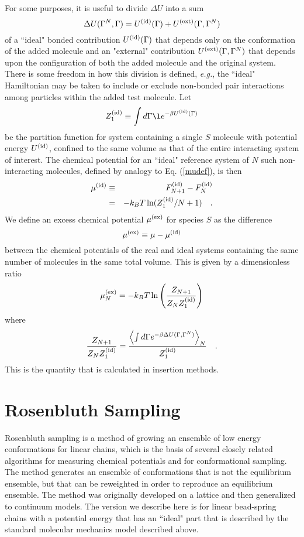 \documentclass[12pt]{article}
\newcommand{\eg}{{\it e.g.}}
\newcommand\system{\Gamma^{N}}
\newcommand\chain{\Gamma}
\newcommand\delU{\Delta U}
\newcommand\Uid{U^{({\rm id})}}
\newcommand\Uext{U^{({\rm ext})}}
\newcommand\Ztot{Z_{N+1}}
\newcommand\Zsystem{Z_{N}}
\newcommand\Zid{Z^{({\rm id})}}
\newcommand\Fid{F^{({\rm id})}}
\newcommand\muid{\mu^{({\rm id})}}
\newcommand\muex{\mu^{({\rm ex})}}
\begin{document}
For some purposes, it is useful to divide $\delU$ into a sum
\begin{equation}
   \delU(\system, \chain) = \Uid(\chain) + \Uext (\chain, \system)
\end{equation}
of a ``ideal" bonded contribution $\Uid(\chain)$ that depends only on the conformation of the added molecule and an "external" contribution $\Uext(\chain,\system)$ that depends upon the configuration of both the added molecule and the original system.  There is some freedom in how this division is defined, \eg, the ``ideal" Hamiltonian may be taken to include or exclude non-bonded pair interactions among particles within the added test molecule. Let 
\begin{equation}
    \Zid_{1} \equiv \int d\chain \l e^{-\beta \Uid(\chain) }
\end{equation}
be the partition function for system containing a single $S$ molecule with potential energy $\Uid$, confined to the same volume as that of the entire interacting system of interest. The chemical potential for an ``ideal" reference system of $N$ such non-interacting molecules, defined by analogy to Eq. (\ref{mudef}), is then
\begin{eqnarray}
    \muid & \equiv & \Fid_{N+1} - \Fid_{N}  \nonumber \\
          & =      & -k_{B}T\ln(\Zid_{1}/N+1)
    \quad.
\end{eqnarray}
We define an excess chemical potential $\muex$ for species $S$ as the difference
\begin{equation}
     \muex \equiv \mu - \muid
\end{equation}
between the chemical potentials of the real and ideal systems containing the same number of molecules in the same total volume. This is given by a dimensionless ratio
\begin{equation}
   \muex_{N}  = -k_{B}T \ln \left ( \frac{\Ztot}{\Zsystem \Zid_{1}} \right )
\end{equation}
where
\begin{equation}
  \frac{\Ztot}{\Zsystem \Zid_{1}} = 
  \frac{\left \langle \int d\chain e^{-\beta \delU(\chain, \system)} \right \rangle_{N}} 
       {\Zid_{1}} 
  \quad.
\end{equation}
This is the quantity that is calculated in insertion methods.

\section{Rosenbluth Sampling} %
Rosenbluth sampling is a method of growing an ensemble of low energy conformations for linear chains, which is the basis of several closely related algorithms for measuring chemical potentials and for conformational sampling. The method generates an ensemble of conformations that is not the equilibrium ensemble, but that can be reweighted in order to reproduce an equilibrium ensemble. The method was originally developed on a lattice and then generalized to continuum models. The version we describe here is for linear bead-spring chains with a potential energy that has an ``ideal" part that is described by the standard molecular mechanics model described above. 
\end{document}
